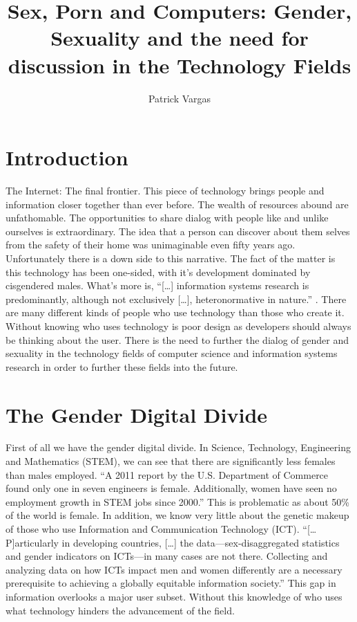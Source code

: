 \documentclass{acmsmall}
\title{Sex, Porn and Computers: Gender, Sexuality and the need for discussion in the Technology Fields}
\author{Patrick Vargas
   \affil{University of Colorado Boulder}}
\begin{document}
\begin{bottomstuff}
\end{bottomstuff}
\maketitle

\section{Introduction}

The Internet: The final frontier. This piece of technology brings people and information closer together than ever before. The wealth of resources abound are unfathomable. The opportunities to share dialog with people like and unlike ourselves is extraordinary. The idea that a person can discover about them selves from the safety of their home was unimaginable even fifty years ago. Unfortunately there is a down side to this narrative. The fact of the matter is this technology has been one-sided, with it's development dominated by cisgendered males. What's more is, ``[\ldots] information systems research is predominantly, although not exclusively [\ldots], heteronormative in nature.'' \cite{light10}. There are many different kinds of people who use technology than those who create it. Without knowing who uses technology is poor design as developers should always be thinking about the user. There is the need to further the dialog of gender and sexuality in the technology fields of computer science and information systems research in order to further these fields into the future.

\section{The Gender Digital Divide}

First of all we have the gender digital divide. In Science, Technology, Engineering and Mathematics (STEM), we can see that there are significantly less females than males employed. ``A 2011 report by the U.S. Department of Commerce found only one in seven engineers is female. Additionally, women have seen no employment growth in STEM jobs since 2000.'' \cite{huhman12} This is problematic as about 50\% of the world is female. In addition, we know very little about the genetic makeup of those who use Information and Communication Technology (ICT). ``[\ldots P]articularly in developing countries, [\ldots] the data---sex-disaggregated statistics and gender indicators on ICTs---in many cases are not there. Collecting and analyzing data on how ICTs impact men and women differently are a necessary prerequisite to achieving a globally equitable information society.'' \cite{hafkin08} This gap in information overlooks a major user subset. Without this knowledge of who uses what technology hinders the advancement of the field.
\end{document}
